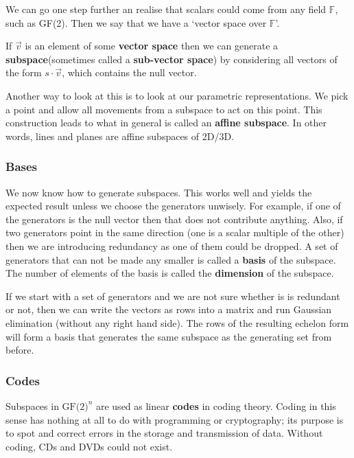 \documentclass{article}
\begin{document}
	\par We can go one step further an realise that scalars could come from any field $\mathbb{F}$, such as GF(2). Then we say that we have a `vector space over $\mathbb{F}$'.
	
	If $\overrightarrow{v}$ is an element of some \textbf{vector space} then we can generate a \textbf{subspace}(sometimes called a \textbf{sub-vector space}) by considering all vectors of the form $s\cdot \overrightarrow{v}$, which contains the null vector.
	
	\par Another way to look at this is to look at our parametric representations. We pick a point and allow all movements from a subspace to act on this point. This construction leads to what in general is called an \textbf{affine subspace}. In other words, lines and planes are affine subspaces of 2D/3D.
	
	\subsubsection{Bases}
	We now know how to generate subspaces. This works well and yields the expected result unless we choose the generators unwisely. For example, if one of the generators is the null vector then that does not contribute anything. Also, if two generators point in the same direction (one is a scalar multiple of the other) then we are introducing redundancy as one of them could be dropped. A set of generators that can not be made any smaller is called a \textbf{basis} of the subspace. The number of elements of the basis is called the \textbf{dimension} of the subspace.
	
	\par 
	If we start with a set of generators and we are not sure whether is is redundant or not, then we can write the vectors as rows into a matrix and run Gaussian elimination (without any right hand side). The rows of the resulting echelon form will form a basis that generates the same subspace as the generating set from before.
	
	\subsubsection{Codes} 
	Subspaces in $\text{GF(2)}^{n}$ are used as linear \textbf{codes} in coding theory. Coding in this sense has nothing at all to do with programming or cryptography; its purpose is to spot and correct errors in the storage and transmission of data. Without coding, CDs and DVDs could not exist.
	
\end{document}
